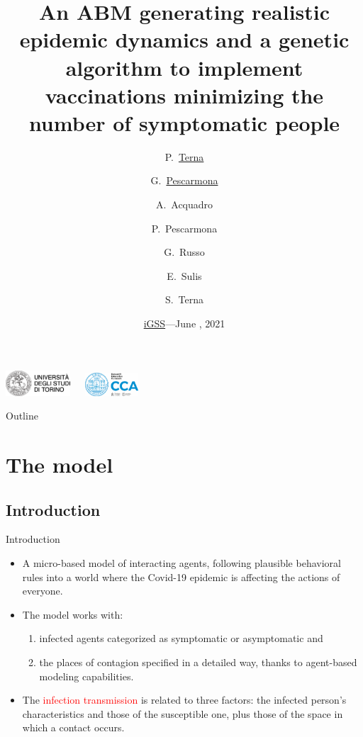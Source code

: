 \documentclass[9pt]{beamer}
\title[Epidemic dynamics] %
{An ABM generating realistic epidemic dynamics and a genetic algorithm to implement vaccinations minimizing the number of symptomatic people}
\author[] %
{P.~\href{https://terna.to.it}{Terna}\inst{1~2} \and G.~\href{http://flipper.diff.org}{Pescarmona}\inst{1} \and A.~Acquadro\inst{1} \and P.~Pescarmona\inst{3} \and G.~Russo\inst{4}  
\and E.~Sulis\inst{1}  \and S.~Terna\inst{5}  }
\institute[] %
{
  \inst{1}%
 University of Torino, Italy
  \and
 \inst{2}%
  Fondazione Collegio Carlo Alberto, Honorary Fellow, Italy
 \and
  \inst{3}%
  University of Groningen, The Netherlands  
  \and
  \inst{4}%
  Centro Einaudi, Torino, Italy
  \and
  \inst{5}%
 tomorrowdata.io
  }
\date[] %
{\href{https://www.igss-workshop.org}{iGSS}---June \nth{8}, 2021}
\begin{document}
\begin{frame}

\includegraphics[width=0.18\textwidth]{logo_unito.png}~~~\includegraphics[width=0.15\textwidth]{CCA_Logo.png}

\titlepage

\end{frame}

\begin{frame}{Outline}

  \tableofcontents
\end{frame}

\section{The model}

\subsection{Introduction}

\begin{frame}{Introduction}

\begin{itemize}

\item
A micro-based model of interacting agents, following plausible behavioral rules into a world where the Covid-19 epidemic is affecting the actions of everyone. 
\item
The model works with: 

\begin{enumerate}[i]
\item infected agents categorized as symptomatic or asymptomatic and 
\item the places of contagion specified in a detailed way, thanks to agent-based modeling capabilities. 
\end{enumerate}

 \item
The \textcolor{red}{infection transmission} is related to three factors: the infected person's characteristics and those of the susceptible one, plus those of the space in which a contact occurs.

\end{itemize}
\end{frame}
\end{document}
